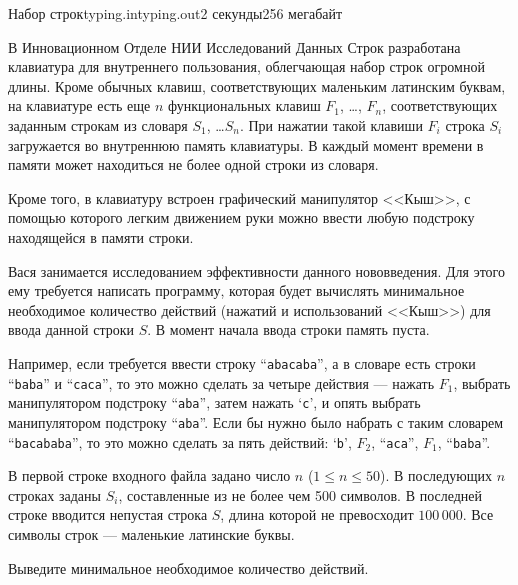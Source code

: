 \begin{problem}{Набор строк}{typing.in}{typing.out}{2 секунды}{256 мегабайт}

В Инновационном Отделе НИИ Исследований Данных Строк разработана клавиатура для внутреннего
пользования, облегчающая набор строк огромной длины. Кроме обычных клавиш, 
соответствующих маленьким латинским буквам, на клавиатуре
есть еще $n$ функциональных клавиш $F_1$, \ldots, $F_n$, 
соответствующих заданным строкам из словаря $S_1$, \ldots $S_n$.
При нажатии такой клавиши $F_i$ строка $S_i$ загружается во внутреннюю память клавиатуры. В
каждый момент времени в памяти может находиться не более
одной строки из словаря.

Кроме того,
в клавиатуру встроен графический манипулятор <<Кыш>>, с помощью которого легким
движением руки можно ввести любую подстроку находящейся в памяти строки.

Вася занимается исследованием эффективности данного нововведения. Для этого
ему требуется написать программу, которая будет вычислять минимальное
необходимое количество действий (нажатий и использований
<<Кыш>>) для ввода данной строки $S$. В момент начала ввода строки память пуста. 

Например, если требуется ввести строку ``\texttt{abacaba}'', а в словаре есть строки
``\texttt{baba}'' и ``\texttt{caca}'', то это можно сделать за четыре действия --- нажать $F_1$, 
выбрать манипулятором подстроку ``\texttt{aba}'', затем нажать `\texttt{c}', и
опять выбрать манипулятором подстроку ``\texttt{aba}''. Если бы нужно было
набрать с таким
словарем ``\texttt{bacababa}'', то это можно сделать за пять действий: `\texttt{b}', $F_2$,
``\texttt{aca}'', $F_1$, ``\texttt{baba}''.


\InputFile

В первой строке входного файла задано число $n$ ($1\le n\le 50$). В последующих $n$
строках заданы $S_i$, составленные из не более чем 500 символов.
В последней строке вводится непустая строка $S$, длина которой не превосходит
$100\,000$. Все символы строк --- маленькие латинские буквы.

\OutputFile

Выведите минимальное необходимое количество действий.

\Example

\begin{example}
%
%
\end{example}

\end{problem}